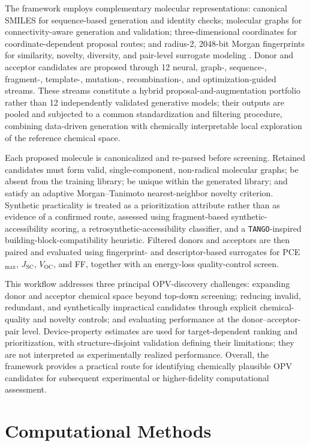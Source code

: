 \documentclass[12pt]{article}
\newcommand{\voc}{$V_\mathrm{OC}$}
\newcommand{\jsc}{$J_\mathrm{SC}$}
\newcommand{\pce}{PCE$_\mathrm{{max}}$}
\begin{document}
The framework employs complementary molecular representations: canonical SMILES for sequence-based generation and identity checks; molecular graphs for connectivity-aware generation and validation; three-dimensional coordinates for coordinate-dependent proposal routes; and radius-2, 2048-bit Morgan fingerprints for similarity, novelty, diversity, and pair-level surrogate modeling \cite{rogers2010extended}. Donor and acceptor candidates are proposed through 12 neural, graph-, sequence-, fragment-, template-, mutation-, recombination-, and optimization-guided streams. These streams constitute a hybrid proposal-and-augmentation portfolio rather than 12 independently validated generative models; their outputs are pooled and subjected to a common standardization and filtering procedure, combining data-driven generation with chemically interpretable local exploration of the reference chemical space.

Each proposed molecule is canonicalized and re-parsed before screening. Retained candidates must form valid, single-component, non-radical molecular graphs; be absent from the training library; be unique within the generated library; and satisfy an adaptive Morgan--Tanimoto nearest-neighbor novelty criterion. Synthetic practicality is treated as a prioritization attribute rather than as evidence of a confirmed route, assessed using fragment-based synthetic-accessibility scoring, a retrosynthetic-accessibility classifier, and a \texttt{TANGO}-inspired building-block-compatibility heuristic. Filtered donors and acceptors are then paired and evaluated using fingerprint- and descriptor-based surrogates for \pce, \jsc, \voc, and FF, together with an energy-loss quality-control screen.

This workflow addresses three principal OPV-discovery challenges: expanding donor and acceptor chemical space beyond top-down screening; reducing invalid, redundant, and synthetically impractical candidates through explicit chemical-quality and novelty controls; and evaluating performance at the donor--acceptor-pair level. Device-property estimates are used for target-dependent ranking and prioritization, with structure-disjoint validation defining their limitations; they are not interpreted as experimentally realized performance. Overall, the framework provides a practical route for identifying chemically plausible OPV candidates for subsequent experimental or higher-fidelity computational assessment.

\section{Computational Methods}
\end{document}
